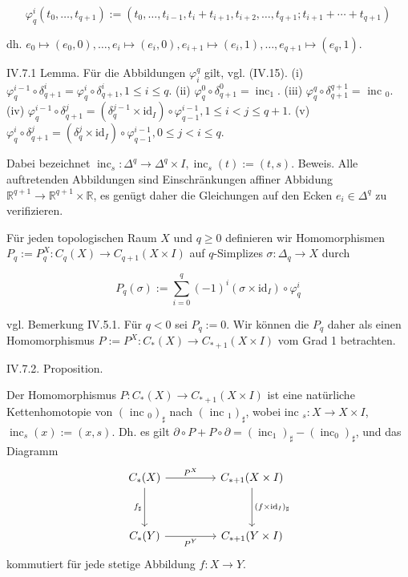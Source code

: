 \documentclass[10pt, letterpaper]{article}
\begin{document}
$$
\varphi_q^i\left(t_0, \ldots, t_{q+1}\right):=\left(t_0, \ldots, t_{i-1}, t_i+t_{i+1}, t_{i+2}, \ldots, t_{q+1} ; t_{i+1}+\cdots+t_{q+1}\right)
$$

dh. $e_0 \mapsto\left(e_0, 0\right), \ldots, e_i \mapsto\left(e_i, 0\right), e_{i+1} \mapsto\left(e_i, 1\right), \ldots, e_{q+1} \mapsto\left(e_q, 1\right)$.


IV.7.1 Lemma. Für die Abbildungen $\varphi_i^q$ gilt, vgl. (IV.15).
(i) $\varphi_q^{i-1} \circ \delta_{q+1}^i=\varphi_q^i \circ \delta_{q+1}^i, 1 \leq i \leq q$.
(ii) $\varphi_q^0 \circ \delta_{q+1}^0=\operatorname{inc}_1$.
(iii) $\varphi_q^q \circ \delta_{q+1}^{q+1}=$ inc $_0$.
(iv) $\varphi_q^{i-1} \circ \delta_{q+1}^j=\left(\delta_q^{j-1} \times \mathrm{id}_I\right) \circ \varphi_{q-1}^{i-1}, 1 \leq i<j \leq q+1$.
(v) $\varphi_q^i \circ \delta_{q+1}^j=\left(\delta_q^j \times \mathrm{id}_I\right) \circ \varphi_{q-1}^{i-1}, 0 \leq j<i \leq q$.

Dabei bezeichnet $\operatorname{inc}_s: \Delta^q \rightarrow \Delta^q \times I, \operatorname{inc}_s(t):=(t, s)$.
Beweis. Alle auftretenden Abbildungen sind Einschränkungen affiner Abbidung $\mathbb{R}^{q+1} \rightarrow \mathbb{R}^{q+1} \times \mathbb{R}$, es genügt daher die Gleichungen auf den Ecken $e_i \in \Delta^q$ zu verifizieren.

Für jeden topologischen Raum $X$ und $q \geq 0$ definieren wir Homomorphismen $P_q:=P_q^X: C_q(X) \rightarrow C_{q+1}(X \times I)$ auf $q$-Simplizes $\sigma: \Delta_q \rightarrow X$ durch

$$
P_q(\sigma):=\sum_{i=0}^q(-1)^i\left(\sigma \times \mathrm{id}_I\right) \circ \varphi_q^i
$$

vgl. Bemerkung IV.5.1. Für $q<0$ sei $P_q:=0$. Wir können die $P_q$ daher als einen Homomorphismus $P:=P^X: C_*(X) \rightarrow C_{*+1}(X \times I)$ vom Grad 1 betrachten.



IV.7.2. Proposition. 

Der Homomorphismus $P: C_*(X) \rightarrow C_{*+1}(X \times I)$ ist eine natürliche Kettenhomotopie von $\left(\text { inc }_0\right)_{\sharp}$ nach $\left(\text { inc }_1\right)_{\sharp}$, wobei inc $_s: X \rightarrow X \times I$, $\operatorname{inc}_s(x):=(x, s)$. Dh. es gilt $\partial \circ P+P \circ \partial=\left(\operatorname{inc}_1\right)_{\sharp}-\left(\operatorname{inc}_0\right)_{\sharp}$, und das Diagramm
\[
\begin{tikzcd}[row sep=3.5em, column sep=4.5em]
C_*(X) \arrow[r, "P^X"] \arrow[d, "f_{\sharp}"'] &
C_{*+1}(X \times I) \arrow[d, "(f \times \mathrm{id}_I)_{\sharp}"] \\
C_*(Y) \arrow[r, "P^Y"'] &
C_{*+1}(Y \times I)
\end{tikzcd}
\]
kommutiert für jede stetige Abbildung $f: X \rightarrow Y$.
\end{document}
